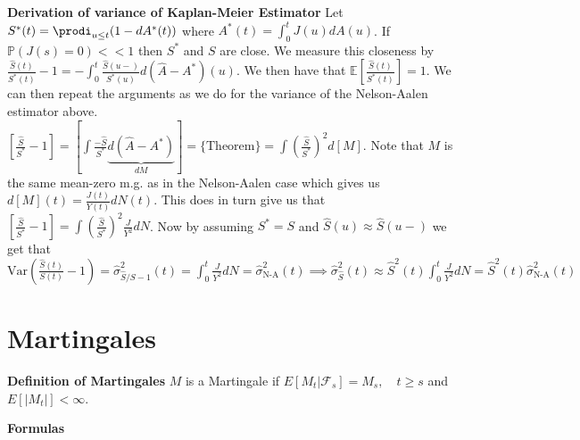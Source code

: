 \documentclass{article}
\begin{document}
\medskip

\textbf{Derivation of variance of Kaplan-Meier Estimator} 
Let $S^*(t) = \prodi_{u\leq t} (1-dA^*(t))$ where $A^*(t) = \int_0^t J(u)dA(u)$. If $\mathbb{P}(J(s) = 0) << 1$ then $S^*$ and $S$ are close. We measure this closeness by $\frac{\hat{S}(t)}{S^*(t)} - 1 = -\int_0^t \frac{\hat{S}(u-)}{S^*(u)}d(\hat{A} - A^*)(u)$. We then have that $\mathbb{E}\left[\frac{\hat{S}(t)}{S^*(t)}\right] = 1$. We can then repeat the arguments as we do for the variance of the Nelson-Aalen estimator above. $\left[\frac{\hat{S}}{S^*} - 1\right] = \left[\int \frac{-\hat{S}}{S^*}\underbrace{d(\hat{A} - A^*)}_{dM}\right] = \{\text{Theorem}\} = \int \left(\frac{\hat{S}}{S^*}\right)^2d[M]$. Note that $M$ is the same mean-zero m.g. as in the Nelson-Aalen case which gives us $d[M](t)=\frac{J(t)}{Y(t)}dN(t)$. This does in turn give us that $\left[\frac{\hat{S}}{S^*}-1\right] = \int \left(\frac{\hat{S}}{S^*}\right)^2 \frac{J}{Y^2}dN$. Now by assuming $S^* = S$ and $\hat{S}(u) \approx \hat{S}(u-)$ we get that $\text{Var}\left(\frac{\hat{S}(t)}{S(t)} - 1\right) = \hat\sigma^2_{\hat{S}/S- 1}(t) = \int_0^t \frac{J}{Y^2}dN = \hat\sigma^2_{\text{N-A}}(t) \implies \hat\sigma^2_{\hat{S}}(t) \approx \hat{S}^2(t)\int_0^t \frac{J}{Y^2}dN = \hat{S}^2(t)\hat\sigma^2_{\text{N-A}}(t)$

\newpage

\section*{Martingales}

\textbf{Definition of Martingales} $M$ is a Martingale if $E[M_t | \mathcal{F}_{s}] = M_s, \quad t\geq s$ and $E[|M_t|] < \infty$. 

\medskip

\textbf{Formulas} 
\end{document}
